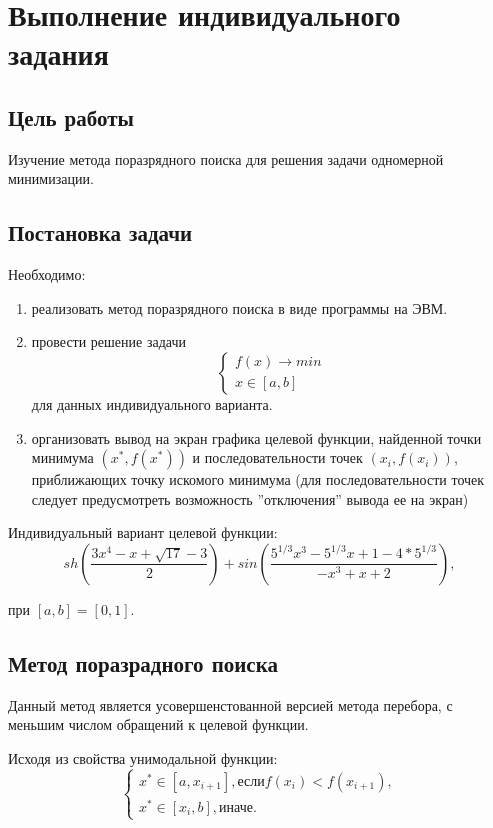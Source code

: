 \chapter{Выполнение индивидуального задания}

\section{Цель работы}

Изучение метода поразрядного поиска для решения задачи одномерной минимизации.

\section{Постановка задачи}

Необходимо:
\begin{enumerate}
\item реализовать метод поразрядного поиска в виде программы на ЭВМ.
\item провести решение задачи
\begin{equation*}
\begin{cases}
f(x) \rightarrow min \\
x \in [a, b]
\end{cases}
\end{equation*}
для данных индивидуального варианта.
\item организовать вывод на экран графика целевой функции, найденной точки минимума $(x^* , f (x^*))$ и последовательности точек $(x_i, f(x_i))$, приближающих точку искомого минимума (для последовательности точек следует предусмотреть возможность ”отключения” вывода ее на экран)
\end{enumerate}

Индивидуальный вариант целевой функции:
\begin{equation*}
sh(\frac{3x^4 - x + \sqrt{17} - 3}{2})+sin(\frac{5^{1/3}x^3 - 5^{1/3}x + 1 - 4*5^{1/3}}{-x^3 + x + 2}),
\end{equation*}

при $[a, b] = [0, 1]$.

\section*{Метод поразрадного поиска}

Данный метод является усовершенстованной версией метода перебора, с меньшим числом обращений к целевой функции.

Исходя из свойства унимодальной функции:
\begin{equation*}
\begin{cases}
x^* \in [a, x_{i+1}], \text{если} f(x_i) < f(x_{i+1}), \\
x^* \in [x_i, b], \text{иначе}.
\end{cases}
\end{equation*}

